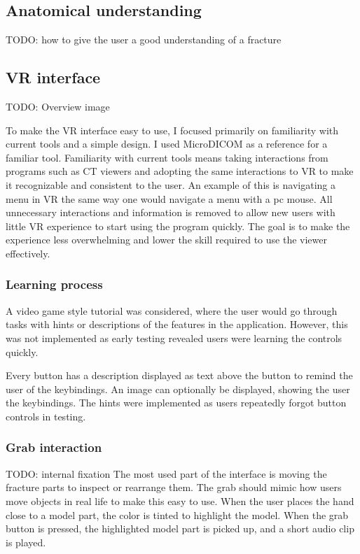 \documentclass[a4paper]{report}
\begin{document}
\subsection{Anatomical understanding}
TODO: how to give the user a good understanding of a fracture

\subsection{VR interface}

TODO: Overview image

To make the VR interface easy to use, I focused primarily on familiarity with current tools and a simple design.
I used MicroDICOM\cite{noauthor_dicom_nodate} as a reference for a familiar tool.
Familiarity with current tools means taking interactions from programs such as CT viewers and adopting the same interactions to VR to make it recognizable and consistent to the user. An example of this is navigating a menu in VR the same way one would navigate a menu with a pc mouse.
 All unnecessary interactions and information is removed to allow new users with little VR experience to start using the program quickly. The goal is to make the experience less overwhelming and lower the skill required to use the viewer effectively.

\subsubsection{Learning process}
A video game style tutorial was considered, where the user would go through tasks with hints or descriptions of the features in the application. However, this was not implemented as early testing revealed users were learning the controls quickly.

Every button has a description displayed as text above the button to remind the user of the keybindings. An image can optionally be displayed, showing the user the keybindings. The hints were implemented as users repeatedly forgot button controls in testing.

\subsubsection{Grab interaction}

TODO: internal fixation
The most used part of the interface is moving the fracture parts to inspect or rearrange them. The grab should mimic how users move objects in real life to make this easy to use. When the user places the hand close to a model part, the color is tinted to highlight the model. When the grab button is pressed, the highlighted model part is picked up, and a short audio clip is played.
\end{document}
